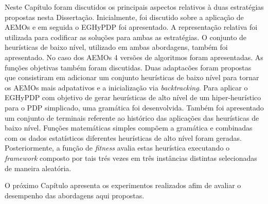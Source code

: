 Neste Capítulo foram discutidos os principais aspectos relativos à duas estratégias propostas nesta Dissertação. Inicialmente, foi discutido sobre a aplicação de AEMOs e em seguida o EGHyPDP foi apresentado. A representação relativa foi utilizada para codificar as soluções para ambas as estratégias. O conjunto de heurísticas de baixo nível, utilizado em ambas abordagens, também foi apresentado. No caso dos AEMOs 4 versões de algoritmos foram apresentadas. As funções objetivas também foram discutidas. Duas adaptacões foram propostas que consistiram em adicionar um conjunto heurísticas de baixo nível para tornar os AEMOs mais adpatativos e a inicialização via \textit{backtracking}. Para aplicar o EGHyPDP com objetivo de gerar heurísticas de alto nível de um  hiper-heurístico para o PDP simplicado, uma  gramática foi desenvolvida. Também foi apresentado um conjunto de terminais referente ao histórico das aplicações das heurísticas de baixo nível. Funções matemáticas simples compõem a gramática e combinadas com os dados estatísticos diferentes heurísticas de alto nível foram geradas. Posteriormente, a função de \textit{fitness} avalia estas heurística executando o \textit{framework} composto por tais trés vezes em três instâncias distintas selecionadas de maneira aleatória.
 
 O próximo Capítulo apresenta os experimentos realizados afim de avaliar o desempenho das abordagens aqui propostas.



